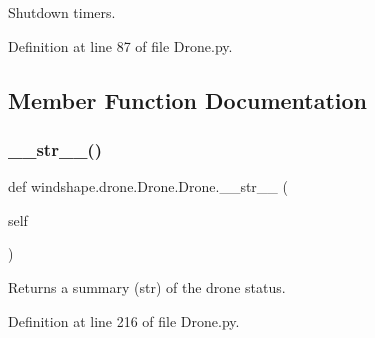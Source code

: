 \begin{DoxyVerb}Shutdown timers.\end{DoxyVerb}
 

Definition at line 87 of file Drone.\+py.



\subsection{Member Function Documentation}
\mbox{\label{classwindshape_1_1drone_1_1_drone_1_1_drone_a6c7c3a3cc6a63aec8e624febc3a40e67}} 
\subsubsection{\texorpdfstring{\+\_\+\+\_\+str\+\_\+\+\_\+()}{\_\_str\_\_()}}
{\footnotesize\ttfamily def windshape.\+drone.\+Drone.\+Drone.\+\_\+\+\_\+str\+\_\+\+\_\+ (\begin{DoxyParamCaption}\item[{}]{self }\end{DoxyParamCaption})}

\begin{DoxyVerb}Returns a summary (str) of the drone status.\end{DoxyVerb}
 

Definition at line 216 of file Drone.\+py.

